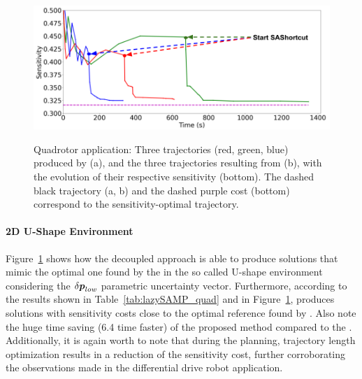 

\begin{figure}[H]
    \centering
    \\
    \includegraphics[width=0.55\linewidth]{figures/samp/U_shape_3in1_sensi.png}
    \caption{Quadrotor application: Three trajectories (red, green, blue) produced by  (a), and the three trajectories resulting from  (b), with the evolution of their respective sensitivity (bottom). 
    The dashed black trajectory (a, b) and the dashed purple cost (bottom) correspond to the  sensitivity-optimal trajectory.}
    \label{fig:U_shape}
\end{figure}

\paragraph{2D U-Shape Environment} 

Figure~\ref{fig:U_shape} shows how the decoupled approach is able to produce solutions that mimic the optimal one found by the  in the so called U-shape environment considering the $\delta\boldsymbol{p}_{low}$ parametric uncertainty vector.
Furthermore, according to the results shown in Table~\ref{tab:lazySAMP_quad} and in Figure~\ref{fig:U_shape},  produces solutions with sensitivity costs close to the optimal reference found by . 
Also note the huge time saving (6.4 time faster) of the proposed method compared to the .
Additionally, it is again worth to note that during the  planning, trajectory length optimization results in a reduction of the sensitivity cost, further corroborating the observations made in the differential drive robot application.


